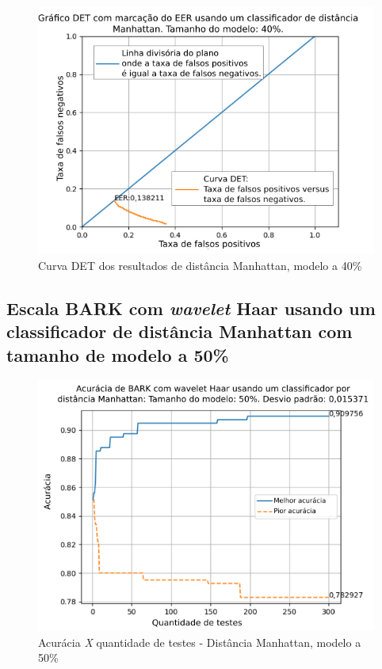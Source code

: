 \begin{figure}[!h]
	\centering
	\includegraphics[width=.9\linewidth]{images/results/det/DET_for_classifier_Manhattan_40}
	\caption{Curva DET dos resultados de distância Manhattan, modelo a 40\%}
	\label{fig:detforclassifiermanhattan40}
\end{figure}

\subsection{Escala BARK com \textit{wavelet} Haar usando um classificador de distância Manhattan com tamanho de modelo a 50\%}



\begin{figure}[ht]
	\centering
	\includegraphics[width=\linewidth]{images/results/confusionMatrices/classifier_Manhattan_50.png}
	\caption{Acurácia \textit{X} quantidade de testes - Distância Manhattan, modelo a 50\%}
	\label{fig:classifiermanhattan50}
\end{figure}

